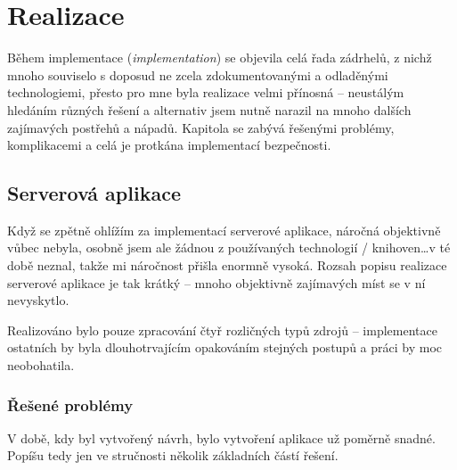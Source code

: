 
\chapter{Realizace}
Během implementace (\textit{implementation}) se objevila celá řada zádrhelů, z nichž mnoho souviselo s doposud ne zcela zdokumentovanými a odladěnými technologiemi, přesto pro mne byla realizace velmi přínosná -- neustálým hledáním různých řešení a alternativ jsem nutně narazil na mnoho dalších zajímavých postřehů a nápadů. Kapitola se zabývá řešenými problémy, komplikacemi a celá je protkána implementací bezpečnosti. %

\section{Serverová aplikace}
Když se zpětně ohlížím za implementací serverové aplikace, náročná objektivně vůbec nebyla, osobně jsem ale žádnou z používaných technologií / knihoven\dots v té době neznal, takže mi náročnost přišla enormně vysoká. Rozsah popisu realizace serverové aplikace je tak krátký -- mnoho objektivně zajímavých míst se v ní nevyskytlo.

Realizováno bylo pouze zpracování čtyř rozličných typů zdrojů -- implementace ostatních by byla dlouhotrvajícím opakováním stejných postupů a práci by moc neobohatila.

\subsection{Řešené problémy}
V době, kdy byl vytvořený návrh, bylo vytvoření aplikace už poměrně snadné. Popíšu tedy jen ve stručnosti několik základních částí řešení.

